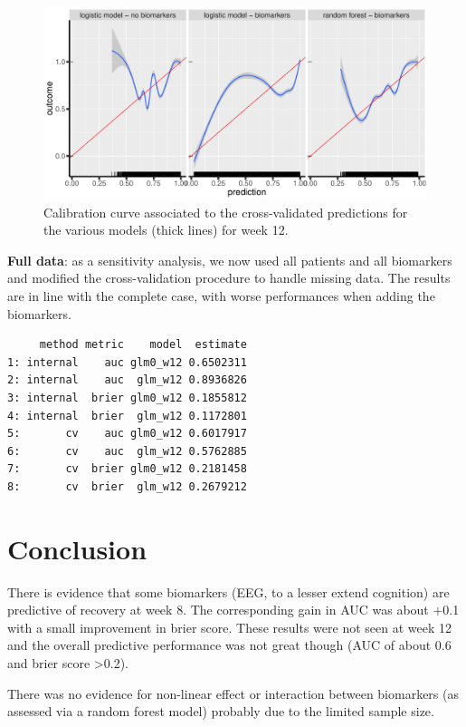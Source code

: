 \documentclass[12pt]{article}
\begin{document}
\begin{figure}[!h]
\centering
\includegraphics[trim={0 0 0 0},width=1\textwidth]{./figures/gg-perfW12-cali.pdf}
\caption{\label{fig:caliW12}Calibration curve associated to the cross-validated predictions for the various models (thick lines) for week 12.}
\end{figure}


\textbf{Full data}: as a sensitivity analysis, we now used all patients and
all biomarkers and modified the cross-validation procedure to handle
missing data. The results are in line with the complete case, with
worse performances when adding the biomarkers.

\begin{verbatim}
     method metric    model  estimate
1: internal    auc glm0_w12 0.6502311
2: internal    auc  glm_w12 0.8936826
3: internal  brier glm0_w12 0.1855812
4: internal  brier  glm_w12 0.1172801
5:       cv    auc glm0_w12 0.6017917
6:       cv    auc  glm_w12 0.5762885
7:       cv  brier glm0_w12 0.2181458
8:       cv  brier  glm_w12 0.2679212
\end{verbatim}


\clearpage

\section{Conclusion}
\label{sec:orgcd6bdc4}

There is evidence that some biomarkers (EEG, to a lesser extend
cognition) are predictive of recovery at week 8. The corresponding
gain in AUC was about +0.1 with a small improvement in brier
score. These results were not seen at week 12 and the overall
predictive performance was not great though (AUC of about 0.6 and
brier score >0.2).

\bigskip

There was no evidence for non-linear effect or interaction between
biomarkers (as assessed via a random forest model) probably due to the
limited sample size.
\end{document}
